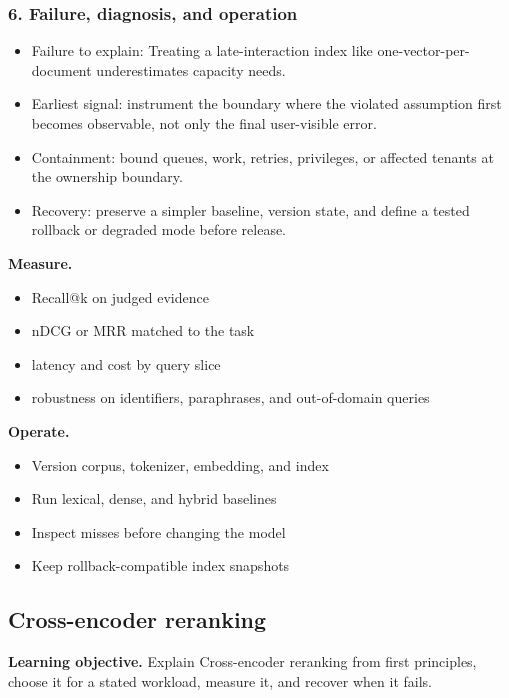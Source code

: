 \subsubsection*{6. Failure, diagnosis, and operation}
\begin{itemize}
\item Failure to explain: Treating a late-interaction index like one-vector-per-document underestimates capacity needs.
\item Earliest signal: instrument the boundary where the violated assumption first becomes observable, not only the final user-visible error.
\item Containment: bound queues, work, retries, privileges, or affected tenants at the ownership boundary.
\item Recovery: preserve a simpler baseline, version state, and define a tested rollback or degraded mode before release.
\end{itemize}
\textbf{Measure.}\begin{itemize}
\item Recall@k on judged evidence
\item nDCG or MRR matched to the task
\item latency and cost by query slice
\item robustness on identifiers, paraphrases, and out-of-domain queries
\end{itemize}
\textbf{Operate.}\begin{itemize}
\item Version corpus, tokenizer, embedding, and index
\item Run lexical, dense, and hybrid baselines
\item Inspect misses before changing the model
\item Keep rollback-compatible index snapshots
\end{itemize}
\subsection{Cross-encoder reranking}
\textbf{Learning objective.} Explain Cross-encoder reranking from first principles, choose it for a stated workload, measure it, and recover when it fails.
